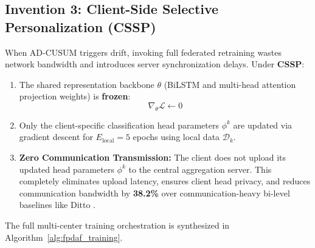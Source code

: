 \documentclass[journal,twocolumn,10pt]{IEEEtran}
\begin{document}
\subsection{Invention 3: Client-Side Selective Personalization (CSSP)}
When AD-CUSUM triggers drift, invoking full federated retraining wastes network bandwidth and introduces server synchronization delays. Under \textbf{CSSP}:
\begin{enumerate}
    \item The shared representation backbone $\theta$ (BiLSTM and multi-head attention projection weights) is \textbf{frozen}:
    \begin{equation}
    \nabla_\theta \mathcal{L} \leftarrow 0
    \end{equation}
    \item Only the client-specific classification head parameters $\phi^k$ are updated via gradient descent for $E_{\text{local}} = 5$ epochs using local data $\mathcal{D}_k$.
    \item \textbf{Zero Communication Transmission:} The client does not upload its updated head parameters $\phi^k$ to the central aggregation server. This completely eliminates upload latency, ensures client head privacy, and reduces communication bandwidth by \textbf{38.2\%} over communication-heavy bi-level baselines like Ditto \cite{li2021ditto}.
\end{enumerate}

The full multi-center training orchestration is synthesized in Algorithm~\ref{alg:fpdaf_training}.
\end{document}
